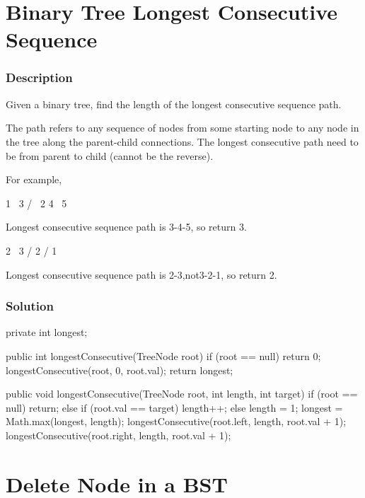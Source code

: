 \newpage

\section{Binary Tree Longest Consecutive Sequence} %

\subsubsection{Description}
Given a binary tree, find the length of the longest consecutive sequence path.

The path refers to any sequence of nodes from some starting node to any node in the tree along the parent-child connections. The longest consecutive path need to be from parent to child (cannot be the reverse).

For example,
\begin{Code}
   1
    \
     3
    / \
   2   4
        \
         5
\end{Code}

Longest consecutive sequence path is 3-4-5, so return 3.
\begin{Code}
   2
    \
     3
    /
   2
  /
 1
\end{Code}

Longest consecutive sequence path is 2-3,not3-2-1, so return 2.

\subsubsection{Solution}

\begin{Code}
private int longest;

public int longestConsecutive(TreeNode root) {
    if (root == null) {
        return 0;
    }
    longestConsecutive(root, 0, root.val);
    return longest;
}

public void longestConsecutive(TreeNode root, int length, int target) {
    if (root == null) {
        return;
    } else if (root.val == target) {
        length++;
    } else {
        length = 1;
    }
    longest = Math.max(longest, length);
    longestConsecutive(root.left, length, root.val + 1);
    longestConsecutive(root.right, length, root.val + 1);
}
\end{Code}

\newpage

\section{Delete Node in a BST} %

